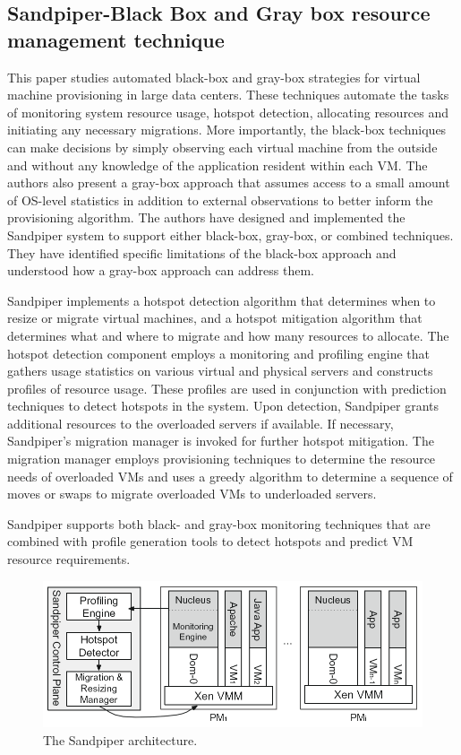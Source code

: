 \documentclass[12pt]{article} %
\begin{document}
\subsection{Sandpiper-Black Box and Gray box resource management technique}
This paper studies automated black-box and gray-box strategies for virtual machine provisioning in large data centers. These techniques automate the tasks of monitoring system resource usage, hotspot detection, allocating resources and initiating any necessary migrations. More importantly, the black-box techniques can make decisions by simply observing each virtual
machine from the outside and without any knowledge of the application resident within each VM. The authors also present a gray-box approach that assumes access to a small
amount of OS-level statistics in addition to external observations
to better inform the provisioning algorithm. The authors have designed and implemented the Sandpiper system to support either black-box, gray-box, or combined
techniques. They have identified specific limitations of the
black-box approach and understood how a gray-box approach
can address them.


Sandpiper implements a hotspot detection algorithm
that determines when to resize or migrate virtual machines,
and a hotspot mitigation algorithm that determines what
and where to migrate and how many resources to allocate.
The hotspot detection component employs a monitoring
and profiling engine that gathers usage statistics on various
virtual and physical servers and constructs profiles of
resource usage. These profiles are used in conjunction with
prediction techniques to detect hotspots in the system.
Upon detection, Sandpiper grants additional resources to
the overloaded servers if available. If necessary, Sandpiper’s migration manager is invoked for further hotspot
mitigation. The migration manager employs provisioning
techniques to determine the resource needs of overloaded
VMs and uses a greedy algorithm to determine a sequence
of moves or swaps to migrate overloaded VMs to underloaded
servers.



Sandpiper supports both black- and gray-box monitoring
techniques that are combined with profile generation
tools to detect hotspots and predict VM resource
requirements.

\begin{figure}[h!]
  \centering
   \includegraphics[scale=0.60]{sandpiper_arch.png}
  \caption{The Sandpiper architecture.}
\end{figure}
\end{document}
